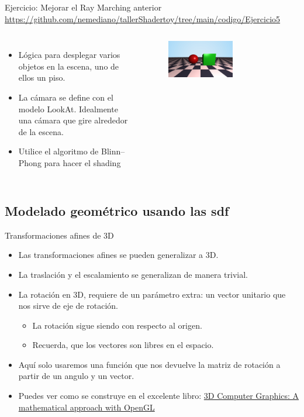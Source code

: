 \begin{frame}{Ejercicio: Mejorar el Ray Marching anterior}
\url{https://github.com/nemediano/tallerShadertoy/tree/main/codigo/Ejercicio5}
\begin{columns}
     \begin{itemize}
         \item Lógica para desplegar varios objetos en la escena, uno de ellos un piso.
         \item La cámara se define con el modelo LookAt. Idealmente una cámara que gire alrededor de la escena.
         \item Utilice el algoritmo de Blinn–Phong para hacer el shading
     \end{itemize}
        \begin{figure}[htb]
            \centering
            \includegraphics[width=0.6\textwidth]{img/Ejer/Ejer5}
        \end{figure}
\end{columns}
\end{frame}

\subsection{Modelado geométrico usando las sdf}

\begin{frame}{Transformaciones afines de 3D}
\begin{itemize}
    \item Las transformaciones afines se pueden generalizar a 3D.
    \item La traslación y el escalamiento se generalizan de manera trivial.
    \item La rotación en 3D, requiere de un parámetro extra: un \alert{vector} unitario que nos sirve de eje de rotación.
    \begin{itemize}
        \item La rotación sigue siendo con respecto al origen.
        \item Recuerda, que los vectores son libres en el espacio.
    \end{itemize}
    \item Aquí solo usaremos una función que nos devuelve la matriz de rotación a partir de un angulo y un vector.
    \item Puedes ver como se construye en el excelente libro: \href{https://mathweb.ucsd.edu/~sbuss/CourseWeb/Math155A_2019Winter/SecondEdDraft.pdf}{3D Computer Graphics: A mathematical approach with OpenGL}
    
\end{itemize}
\end{frame}

